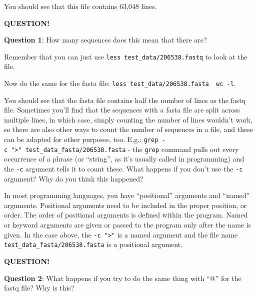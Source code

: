 \documentclass[
]{book}
\newenvironment{bluebox}{
  \definecolor{shadecolor}{RGB}{172, 210, 237}
  \color{white}
  \begin{shaded}}
 {\end{shaded}}
\begin{document}
You should see that this file contains 63,048 lines.

\begin{bluebox}

\begin{center}
\textbf{QUESTION!}

\end{center}

\textbf{Question 1}: How many sequences does this mean that there are?

\end{bluebox}

Remember that you can just use \texttt{less\ test\_data/206538.fastq} to look at the file.

Now do the same for the fasta file: \texttt{less\ test\_data/206538.fasta\ \textbar{}\ wc\ -l}.

You should see that the fasta file contains half the number of lines as the fastq file. Sometimes you'll find that the sequences with a fasta file are split across multiple lines, in which case, simply counting the number of lines wouldn't work, so there are also other ways to count the number of sequences in a file, and these can be adapted for other purposes, too. E.g.: \texttt{grep\ -c\ "\textgreater{}"\ test\_data\_fasta/206538.fasta} - the \texttt{grep} command pulls out every occurrence of a phrase (or ``string'', as it's usually called in programming) and the \texttt{-c} argument tells it to count these. What happens if you don't use the \texttt{-c} argument? Why do you think this happened?

In most programming languages, you have ``positional'' arguments and ``named'' arguments. Positional arguments need to be included in the proper position, or order. The order of positional arguments is defined within the program. Named or keyword arguments are given or passed to the program only after the name is given. In the case above, the \texttt{-c\ "\textgreater{}"} is a named argument and the file name \texttt{test\_data\_fasta/206538.fasta} is a positional argument.

\begin{bluebox}

\begin{center}
\textbf{QUESTION!}

\end{center}

\textbf{Question 2}: What happens if you try to do the same thing with ``@'' for the fastq file? Why is this?

\end{bluebox}
\end{document}
